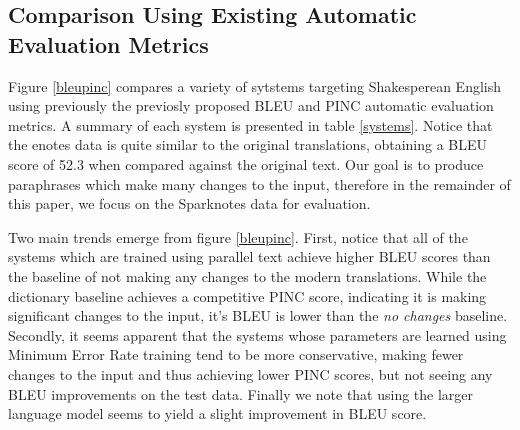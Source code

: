 \documentclass[10pt,a5paper,twoside]{article}
\begin{document}
\subsection{Comparison Using Existing Automatic Evaluation Metrics}
Figure \ref{bleupinc} compares a variety of sytstems targeting Shakesperean English using previously the previosly proposed BLEU \cite{Papineni02} and PINC \cite{chen11} automatic evaluation metrics.  A summary of each system is presented in table \ref{systems}.  Notice that the enotes data is quite similar to the original translations,
obtaining a BLEU score of 52.3 when compared against the original text.  Our goal is to produce paraphrases which make many changes to the input, therefore
in the remainder of this paper, we focus on the Sparknotes data for evaluation.

Two main trends emerge from figure \ref{bleupinc}.  First, notice that all of the systems which are trained using parallel text achieve higher BLEU scores than the baseline
of not making any changes to the modern translations.  While the dictionary baseline achieves a competitive PINC score, indicating it is making significant changes to the 
input, it's BLEU is lower than the \emph{no changes} baseline.  Secondly, it seems apparent that the systems whose parameters are learned using Minimum Error Rate training
tend to be more conservative, making fewer changes to the input and thus achieving lower PINC scores, but not seeing any BLEU improvements on the test data.  Finally
we note that using the larger language model seems to yield a slight improvement in BLEU score.
\end{document}
